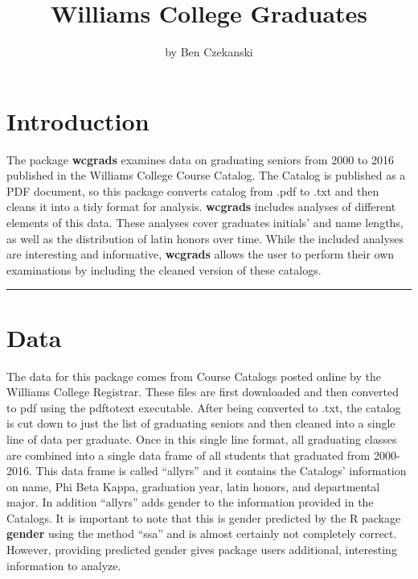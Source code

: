 \title{Williams College Graduates}
\author{by Ben Czekanski}

\maketitle


\section{Introduction}\label{introduction}

The package \textbf{wcgrads} examines data on graduating seniors from
2000 to 2016 published in the Williams College Course Catalog. The
Catalog is published as a PDF document, so this package converts catalog
from .pdf to .txt and then cleans it into a tidy format for analysis.
\textbf{wcgrads} includes analyses of different elements of this data.
These analyses cover graduates initials' and name lengths, as well as
the distribution of latin honors over time. While the included analyses
are interesting and informative, \textbf{wcgrads} allows the user to
perform their own examinations by including the cleaned version of these
catalogs.

\begin{center}\rule{0.5\linewidth}{\linethickness}\end{center}

\section{Data}\label{data}

The data for this package comes from Course Catalogs posted online by
the Williams College Registrar. These files are first downloaded and
then converted to pdf using the pdftotext executable. After being
converted to .txt, the catalog is cut down to just the list of
graduating seniors and then cleaned into a single line of data per
graduate. Once in this single line format, all graduating classes are
combined into a single data frame of all students that graduated from
2000-2016. This data frame is called ``allyrs'' and it contains the
Catalogs' information on name, Phi Beta Kappa, graduation year, latin
honors, and departmental major. In addition ``allyrs'' adds gender to
the information provided in the Catalogs. It is important to note that
this is gender predicted by the R package \textbf{gender} using the
method ``ssa'' and is almost certainly not completely correct. However,
providing predicted gender gives package users additional, interesting
information to analyze.

